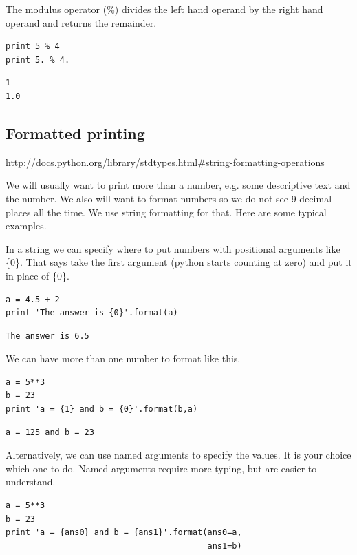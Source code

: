 \documentclass[11pt]{article}
\begin{document}
The modulus operator (\%) divides the left hand operand by the right hand operand and returns the remainder.

\begin{verbatim}
print 5 % 4
print 5. % 4.
\end{verbatim}

\begin{verbatim}
1
1.0
\end{verbatim}


\subsection{Formatted printing}
\label{sec-3-2}
\url{http://docs.python.org/library/stdtypes.html#string-formatting-operations}

We will usually want to print more than a number, e.g. some descriptive text and the number. We also will want to format numbers so we do not see 9 decimal places all the time. We use string formatting for that. Here are some typical examples.

In a string we can specify where to put numbers with positional arguments like \{0\}. That says take the first argument (python starts counting at zero) and put it in place of \{0\}.

\begin{verbatim}
a = 4.5 + 2
print 'The answer is {0}'.format(a)
\end{verbatim}

\begin{verbatim}
The answer is 6.5
\end{verbatim}


We can have more than one number to format like this.
\begin{verbatim}
a = 5**3
b = 23
print 'a = {1} and b = {0}'.format(b,a)
\end{verbatim}

\begin{verbatim}
a = 125 and b = 23
\end{verbatim}

Alternatively, we can use named arguments to specify the values. It is your choice which one to do. Named arguments require more typing, but are easier to understand.
\begin{verbatim}
a = 5**3
b = 23
print 'a = {ans0} and b = {ans1}'.format(ans0=a,
                                         ans1=b)
\end{verbatim}
\end{document}
